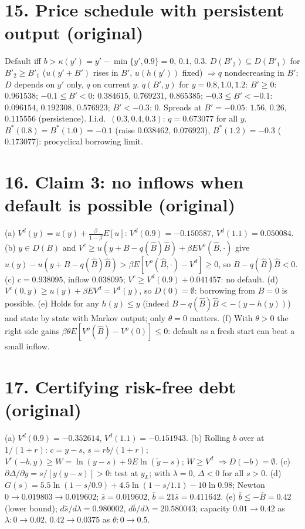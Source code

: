 \documentclass[11pt,a4paper]{article}
\begin{document}
\section*{15. Price schedule with persistent output (original)}

Default iff $b>\kappa(y')=y'-\min\{y',0.9\}=0,\,0.1,\,0.3$. $D(B'_2)\subseteq D(B'_1)$ for $B'_2\ge B'_1$ ($u(y'+B')$ rises in $B'$, $u(h(y'))$ fixed) $\Rightarrow q$ nondecreasing in $B'$;
$D$ depends on $y'$ only, $q$ on current $y$.
$q(B',y)$ for $y=0.8,1.0,1.2$: $B'\ge0$: $0.961538$; $-0.1\le B'<0$: $0.384615,\,0.769231,\,0.865385$; $-0.3\le B'<-0.1$: $0.096154,\,0.192308,\,0.576923$; $B'<-0.3$: $0$.
Spreads at $B'=-0.05$: $1.56$, $0.26$, $0.115556$ (persistence). I.i.d.\ $(0.3,0.4,0.3)$: $q=0.673077$ for all $y$.
$B^*(0.8)=B^*(1.0)=-0.1$ (raise $0.038462$, $0.076923$), $B^*(1.2)=-0.3$ ($0.173077$): procyclical borrowing limit.

\section*{16. Claim 3: no inflows when default is possible (original)}

(a) $V^d(y)=u(y)+\frac{\beta}{1-\beta}E[u]$: $V^d(0.9)=-0.150587$, $V^d(1.1)=0.050084$.
(b) $y\in D(B)$ and $V^c\ge u(y+B-q(\hat B)\hat B)+\beta E V^o(\hat B,\cdot)$ give $u(y)-u(y+B-q(\hat B)\hat B)>\beta E[V^o(\hat B,\cdot)-V^d]\ge0$, so $B-q(\hat B)\hat B<0$.
(c) $c=0.938095$, inflow $0.038095$; $V^c\ge V^d(0.9)+0.041457$: no default. (d) $V^c(0,y)\ge u(y)+\beta EV^d=V^d(y)$, so $D(0)=\emptyset$: borrowing from $B=0$ is possible.
(e) Holds for any $h(y)\le y$ (indeed $B-q(\hat B)\hat B<-(y-h(y))$) and state by state with Markov output; only $\theta=0$ matters.
(f) With $\theta>0$ the right side gains $\beta\theta E[V^o(\hat B)-V^o(0)]\le0$: default as a fresh start can beat a small inflow.

\section*{17. Certifying risk-free debt (original)}

(a) $V^d(0.9)=-0.352614$, $V^d(1.1)=-0.151943$. (b) Rolling $b$ over at $1/(1+r)$: $c=y-s$, $s=rb/(1+r)$; $V^c(-b,y)\ge W=\ln(y-s)+9E\ln(\tilde y-s)$; $W\ge V^d$ $\Rightarrow D(-b)=\emptyset$.
(c) $\partial\Delta/\partial y=s/[y(y-s)]>0$: test at $y_L$; with $\lambda=0$, $\Delta<0$ for all $s>0$.
(d) $G(s)=5.5\ln(1-s/0.9)+4.5\ln(1-s/1.1)-10\ln0.98$; Newton $0\to0.019803\to0.019602$; $\bar s=0.019602$, $\bar b=21\bar s=0.411642$.
(e) $\bar b\le-\bar B=0.42$ (lower bound); $d\bar s/d\lambda=0.980002$, $d\bar b/d\lambda=20.580043$; capacity $0.01\to0.42$ as $\lambda:0\to0.02$, $0.42\to0.0375$ as $\theta:0\to0.5$.
\end{document}
